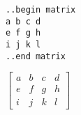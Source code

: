 \documentclass[12pt]{article}
\begin{document}
\begin{flushleft}

\verb|..begin matrix|\\
\verb|a b c d|\\
\verb|e f g h|\\
\verb|i j k l|\\
\verb|..end matrix|

\medskip

$\begin{bmatrix}
a & b & c & d \\
e & f & g & h \\
i & j & k & l 
\end{bmatrix}$
\end{flushleft}
\end{document}
